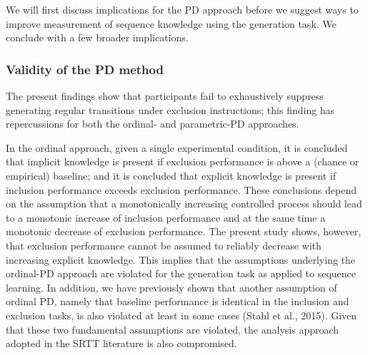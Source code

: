 \documentclass[man]{apa6}
\theoremstyle{definition}
\theoremstyle{definition}
\theoremstyle{definition}
\theoremstyle{remark}
\begin{document}
We will first discuss implications for the PD approach before we suggest
ways to improve measurement of sequence knowledge using the generation
task. We conclude with a few broader implications.

\subsubsection{Validity of the PD
method}\label{validity-of-the-pd-method}

The present findings show that participants fail to exhaustively
suppress generating regular transitions under exclusion instructions;
this finding has repercussions for both the ordinal- and parametric-PD
approaches.

In the ordinal approach, given a single experimental condition, it is
concluded that implicit knowledge is present if exclusion performance is
above a (chance or empirical) baseline; and it is concluded that
explicit knowledge is present if inclusion performance exceeds exclusion
performance. These conclusions depend on the assumption that a
monotonically increasing controlled process should lead to a monotonic
increase of inclusion performance and at the same time a monotonic
decrease of exclusion performance. The present study shows, however,
that exclusion performance cannot be assumed to reliably decrease with
increasing explicit knowledge. This implies that the assumptions
underlying the ordinal-PD approach are violated for the generation task
as applied to sequence learning. In addition, we have previously shown
that another assumption of ordinal PD, namely that baseline performance
is identical in the inclusion and exclusion tasks, is also violated at
least in some cases (Stahl et al., 2015). Given that these two
fundamental assumptions are violated, the analysis approach adopted in
the SRTT literature is also compromised.
\end{document}
